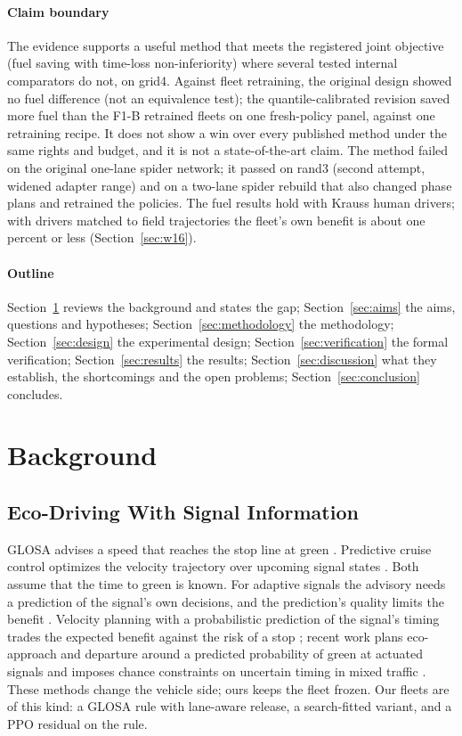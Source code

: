 \paragraph{Claim boundary} The evidence supports a useful method that meets the registered joint objective (fuel saving with
time-loss non-inferiority) where several tested internal comparators do not, on grid4. Against fleet retraining, the original design
showed no fuel difference (not an equivalence test); the quantile-calibrated revision saved more fuel than the F1-B retrained fleets on one
fresh-policy panel, against one retraining recipe. It does not show a win over every
published method under the same rights and budget, and it is not a state-of-the-art claim. The method failed on the original one-lane
spider network; it passed on rand3 (second attempt, widened adapter range) and on a two-lane spider rebuild that also changed phase plans
and retrained the policies. The fuel results hold with Krauss human drivers; with drivers matched to field trajectories the fleet's own
benefit is about one percent or less (Section~\ref{sec:w16}).

\paragraph{Outline} Section~\ref{sec:background} reviews the background and states the gap; Section~\ref{sec:aims} the aims,
questions and hypotheses; Section~\ref{sec:methodology} the methodology; Section~\ref{sec:design} the experimental design;
Section~\ref{sec:verification} the formal verification; Section~\ref{sec:results} the results; Section~\ref{sec:discussion} what they
establish, the shortcomings and the open problems; Section~\ref{sec:conclusion} concludes.

\section{Background}\label{sec:background}
\subsection{Eco-Driving With Signal Information}
GLOSA advises a speed that reaches the stop line at green \cite{katsaros2011}. Predictive cruise control optimizes the velocity trajectory
over upcoming signal states \cite{asadi2011}. Both assume that the time to green is known. For adaptive signals the advisory needs a
prediction of the signal's own decisions, and the prediction's quality limits the benefit \cite{bodenheimer2014}. Velocity planning with a
probabilistic prediction of the signal's timing trades the expected benefit against the risk of a stop \cite{mahler2014}; recent work
plans eco-approach and departure around a predicted probability of green at actuated signals \cite{li2025ead} and imposes chance
constraints on uncertain timing in mixed traffic \cite{xue2026cc}. These methods change the vehicle side; ours keeps the fleet frozen. Our fleets are of
this kind: a GLOSA rule with lane-aware release, a search-fitted variant, and a PPO residual on the rule.

